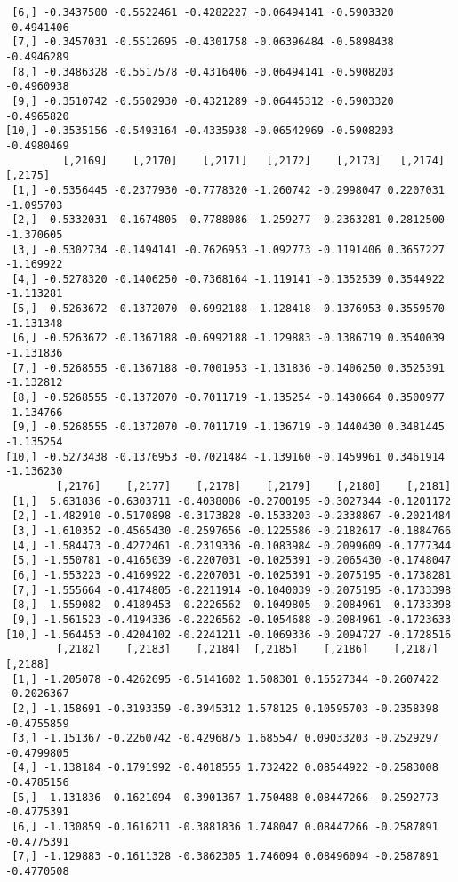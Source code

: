 \documentclass[
  letterpaper,
  DIV=11,
  numbers=noendperiod]{scrreprt}
\begin{document}
\begin{verbatim}
 [6,] -0.3437500 -0.5522461 -0.4282227 -0.06494141 -0.5903320 -0.4941406
 [7,] -0.3457031 -0.5512695 -0.4301758 -0.06396484 -0.5898438 -0.4946289
 [8,] -0.3486328 -0.5517578 -0.4316406 -0.06494141 -0.5908203 -0.4960938
 [9,] -0.3510742 -0.5502930 -0.4321289 -0.06445312 -0.5903320 -0.4965820
[10,] -0.3535156 -0.5493164 -0.4335938 -0.06542969 -0.5908203 -0.4980469
         [,2169]    [,2170]    [,2171]   [,2172]    [,2173]   [,2174]   [,2175]
 [1,] -0.5356445 -0.2377930 -0.7778320 -1.260742 -0.2998047 0.2207031 -1.095703
 [2,] -0.5332031 -0.1674805 -0.7788086 -1.259277 -0.2363281 0.2812500 -1.370605
 [3,] -0.5302734 -0.1494141 -0.7626953 -1.092773 -0.1191406 0.3657227 -1.169922
 [4,] -0.5278320 -0.1406250 -0.7368164 -1.119141 -0.1352539 0.3544922 -1.113281
 [5,] -0.5263672 -0.1372070 -0.6992188 -1.128418 -0.1376953 0.3559570 -1.131348
 [6,] -0.5263672 -0.1367188 -0.6992188 -1.129883 -0.1386719 0.3540039 -1.131836
 [7,] -0.5268555 -0.1367188 -0.7001953 -1.131836 -0.1406250 0.3525391 -1.132812
 [8,] -0.5268555 -0.1372070 -0.7011719 -1.135254 -0.1430664 0.3500977 -1.134766
 [9,] -0.5268555 -0.1372070 -0.7011719 -1.136719 -0.1440430 0.3481445 -1.135254
[10,] -0.5273438 -0.1376953 -0.7021484 -1.139160 -0.1459961 0.3461914 -1.136230
        [,2176]    [,2177]    [,2178]    [,2179]    [,2180]    [,2181]
 [1,]  5.631836 -0.6303711 -0.4038086 -0.2700195 -0.3027344 -0.1201172
 [2,] -1.482910 -0.5170898 -0.3173828 -0.1533203 -0.2338867 -0.2021484
 [3,] -1.610352 -0.4565430 -0.2597656 -0.1225586 -0.2182617 -0.1884766
 [4,] -1.584473 -0.4272461 -0.2319336 -0.1083984 -0.2099609 -0.1777344
 [5,] -1.550781 -0.4165039 -0.2207031 -0.1025391 -0.2065430 -0.1748047
 [6,] -1.553223 -0.4169922 -0.2207031 -0.1025391 -0.2075195 -0.1738281
 [7,] -1.555664 -0.4174805 -0.2211914 -0.1040039 -0.2075195 -0.1733398
 [8,] -1.559082 -0.4189453 -0.2226562 -0.1049805 -0.2084961 -0.1733398
 [9,] -1.561523 -0.4194336 -0.2226562 -0.1054688 -0.2084961 -0.1723633
[10,] -1.564453 -0.4204102 -0.2241211 -0.1069336 -0.2094727 -0.1728516
        [,2182]    [,2183]    [,2184]  [,2185]    [,2186]    [,2187]    [,2188]
 [1,] -1.205078 -0.4262695 -0.5141602 1.508301 0.15527344 -0.2607422 -0.2026367
 [2,] -1.158691 -0.3193359 -0.3945312 1.578125 0.10595703 -0.2358398 -0.4755859
 [3,] -1.151367 -0.2260742 -0.4296875 1.685547 0.09033203 -0.2529297 -0.4799805
 [4,] -1.138184 -0.1791992 -0.4018555 1.732422 0.08544922 -0.2583008 -0.4785156
 [5,] -1.131836 -0.1621094 -0.3901367 1.750488 0.08447266 -0.2592773 -0.4775391
 [6,] -1.130859 -0.1616211 -0.3881836 1.748047 0.08447266 -0.2587891 -0.4775391
 [7,] -1.129883 -0.1611328 -0.3862305 1.746094 0.08496094 -0.2587891 -0.4770508

\end{verbatim}
\end{document}
